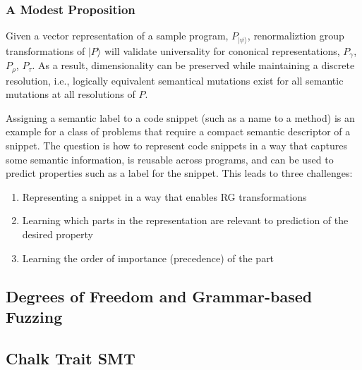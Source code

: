 \subsubsection{A Modest Proposition}
Given a vector representation of a sample program, $P_{\lvert\psi\rangle}$, renormaliztion group transformations of 
$\lvert P \rangle$ will validate universality for cononical representations, $P_{\gamma}$, $P_{\rho}$, $P_{\tau}$. As a 
result, dimensionality can be preserved while maintaining a discrete resolution, i.e., logically equivalent semantical 
mutations exist for all semantic mutations at all resolutions of $P$.

Assigning a semantic label to a code snippet (such as a name to a method) is an example for a class of problems that require 
a compact semantic descriptor of a snippet. The question is how to represent code snippets in a way that captures some semantic 
information, is reusable across programs, and can be used to predict properties such as a label for the snippet. This leads 
to three challenges:
%
\begin{enumerate}
  \item Representing a snippet in a way that enables RG transformations
  \item Learning which parts in the representation are relevant to prediction of the desired property
  \item Learning the order of importance (precedence) of the part
\end{enumerate}

\subsection{Degrees of Freedom and Grammar-based Fuzzing}



\subsection{Chalk Trait SMT}

